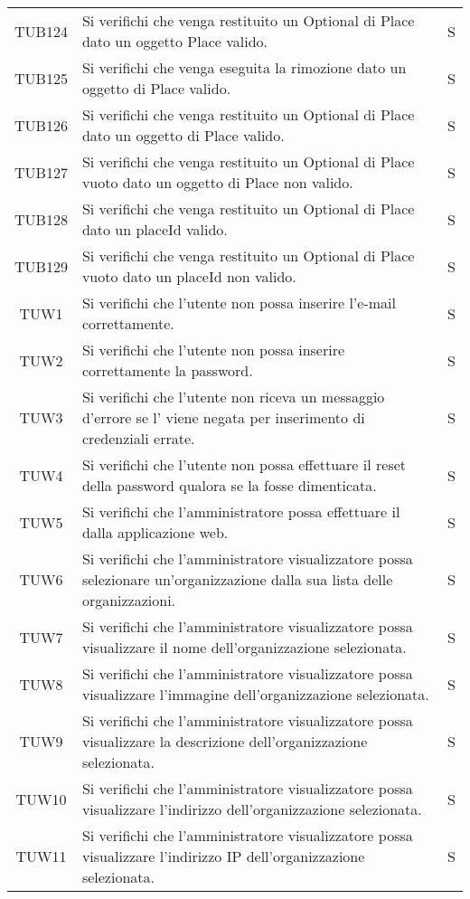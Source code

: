 {\begin{longtable}{ c C{13cm} C{1cm}}
TUB124 & Si verifichi che venga restituito un Optional di Place dato un oggetto Place valido. & S \\
TUB125 & Si verifichi che venga eseguita la rimozione dato un oggetto di Place valido. & S \\
TUB126 & Si verifichi che venga restituito un Optional di Place dato un oggetto di Place valido. & S \\
TUB127 & Si verifichi che venga restituito un Optional di Place vuoto dato un oggetto di Place non valido. & S \\
TUB128 & Si verifichi che venga restituito un Optional di Place dato un placeId valido. & S \\
TUB129 & Si verifichi che venga restituito un Optional di Place vuoto dato un placeId non valido. & S \\
TUW1 & Si verifichi che l’utente non  possa inserire l'e-mail correttamente. & S \\
TUW2 & Si verifichi che l’utente non  possa inserire correttamente la password. & S \\
TUW3 & Si verifichi che l’utente non  riceva un messaggio d'errore se l' viene negata per inserimento di credenziali errate. & S \\
TUW4 & Si verifichi che l’utente non  possa effettuare il reset della password qualora se la fosse dimenticata. & S \\
TUW5 & Si verifichi che l'amministratore  possa effettuare il  dalla applicazione web. & S \\
TUW6 & Si verifichi che l’amministratore visualizzatore possa selezionare un’organizzazione dalla sua lista delle organizzazioni. & S \\
TUW7 & Si verifichi che l'amministratore visualizzatore possa visualizzare il nome dell'organizzazione selezionata. & S \\
TUW8 & Si verifichi che l'amministratore visualizzatore possa visualizzare l’immagine dell'organizzazione selezionata. & S \\
TUW9 & Si verifichi che l'amministratore visualizzatore possa visualizzare la descrizione dell'organizzazione selezionata. & S \\
TUW10 & Si verifichi che l'amministratore visualizzatore possa visualizzare l’indirizzo dell'organizzazione selezionata. & S \\
TUW11 & Si verifichi che l'amministratore visualizzatore possa visualizzare l’indirizzo IP dell'organizzazione selezionata. & S \\

\end{longtable}}
